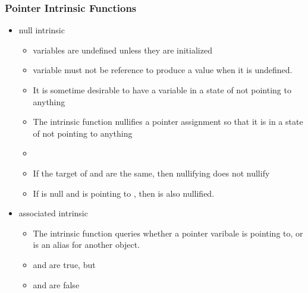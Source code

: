 \documentclass[10pt,t]{beamer}
\begin{document}
\begin{frame}
  \frametitle{\small Pointer Intrinsic Functions}
  \begin{itemize}
    \item null intrinsic
    \begin{itemize}
      \item {} variables are undefined unless they are initialized
      \item {} variable must not be reference to produce a value when it is undefined.
      \item It is sometime desirable to have a  variable in a state of not pointing to anything
      \item The  intrinsic function nullifies a pointer assignment so that it is in a state of not pointing to anything
      \item[] 
      \item If the target of  and  are the same, then nullifying  does not nullify 
      \item If  is null and  is pointing to , then  is also nullified.
    \end{itemize}
    \item associated intrinsic
    \begin{itemize}
      \item The  intrinsic function queries whether a pointer varibale is pointing to, or is an alias for another object.
      \item[]  and  are true, but
      \item[]  and  are false
    \end{itemize}
  \end{itemize}
\end{frame}
\end{document}
